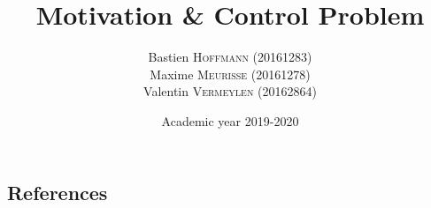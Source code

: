 \documentclass[a4paper, 12pt]{article}
\title{Motivation \& Control Problem}
\author{
    Bastien \textsc{Hoffmann} (20161283)\\
    Maxime \textsc{Meurisse} (20161278)\\
    Valentin \textsc{Vermeylen} (20162864)\\
}
\date{Academic year 2019-2020}
\begin{document}
    
    
    
    
    
    
    
    
    
    
    \newpage
    \subsection{References}
    \nocite{*}
    \printbibliography
\end{document}
